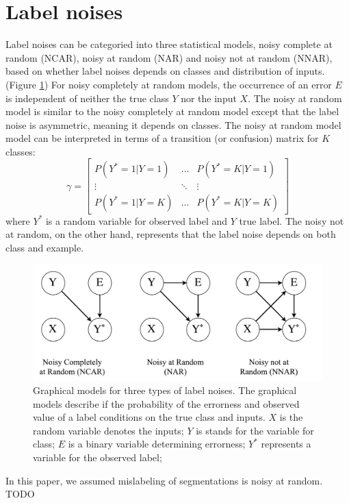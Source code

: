 


\section{Label noises}


Label noises can be categoried into three statistical models, noisy complete at random (NCAR), noisy at random (NAR) and noisy not at random (NNAR), based on whether label noises depends on classes and distribution of inputs. (Figure \ref{fig:noises})
For noisy completely at random models, the occurrence of an error $E$ is independent of neither the true class $Y$ nor the input $X$.
The noisy at random model is similar to the noisy completely at random model except that the label noise is asymmetric, meaning it depends on classes.
The noisy at random model model can be interpreted in terms of a transition (or confusion) matrix for $K$ classes:
\[
\gamma =
\begin{bmatrix}
    P(Y^{\ast}=1\vert Y=1)   & \dots  & P(Y^{\ast}=K\vert Y=1) \\
    \vdots                   & \ddots & \vdots \\
    P(Y^{\ast}=1\vert Y=K) & \dots  & P(Y^{\ast}=K\vert Y=K)
\end{bmatrix}
\]
where $Y^{\ast}$ is a random variable for observed label and $Y$ true label.
The noisy not at random, on the other hand, represents that the label noise depends on both class and example.

\begin{figure}[t]
\begin{center}
   \includegraphics[width=1.05\linewidth]{img/label_noises}
\end{center}
   \caption{
   Graphical models for three types of label noises. \cite{frenay2014classification}
   The graphical models describe if the probability of the errorness and observed value of a label conditions on the true class and inputs.
   $X$ is the random variable denotes the inputs;
   $Y$ is stands for the variable for class;
   $E$ is a binary variable determining errorness;
   $Y^{\ast}$ represents a variable for the observed label;
   }
\label{fig:noises}
\end{figure}

In this paper, we assumed mislabeling of segmentations is noisy at random. {TODO}
